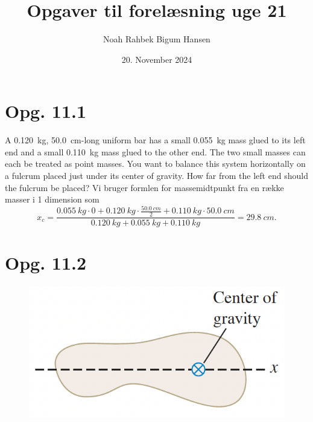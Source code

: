 \documentclass[12pt]{article}
\title{Opgaver til forelæsning uge 21}
\author{Noah Rahbek Bigum Hansen}
\date{20. November 2024}
\theoremstyle{definition}
\begin{document}
\maketitle

\section*{Opg. 11.1}
A \qty{0,120}{kg}, \qty{50,0}{cm}-long uniform bar has a small \qty{0,055}{kg}  mass glued to its left end and a small \qty{0,110}{kg}  mass glued to the other end. The two small masses can each be treated as point masses. You want to balance this system horizontally on a fulcrum placed just under its center of gravity. How far from the left end should the fulcrum be placed?
\bigbreak
Vi bruger formlen for massemidtpunkt fra en række masser i 1 dimension som
\[ 
x_c = \frac{\qty{0,055}{kg} \cdot 0 + \qty{0,120}{kg} \cdot \frac{\qty{50,0}{cm}}{2} + \qty{0,110}{kg} \cdot \qty{50,0}{cm}}{\qty{0,120}{kg} + \qty{0,055}{kg} + \qty{0,110}{kg}} = \qty{29,8}{cm} 
.\]



\section*{Opg. 11.2}
\begin{figure} [ht]
  \centering
  \caption{}
  \includegraphics[width=0.35\linewidth]{../figures/E11_2.png}
  \label{fig:E11_2}
\end{figure}
\end{document}
